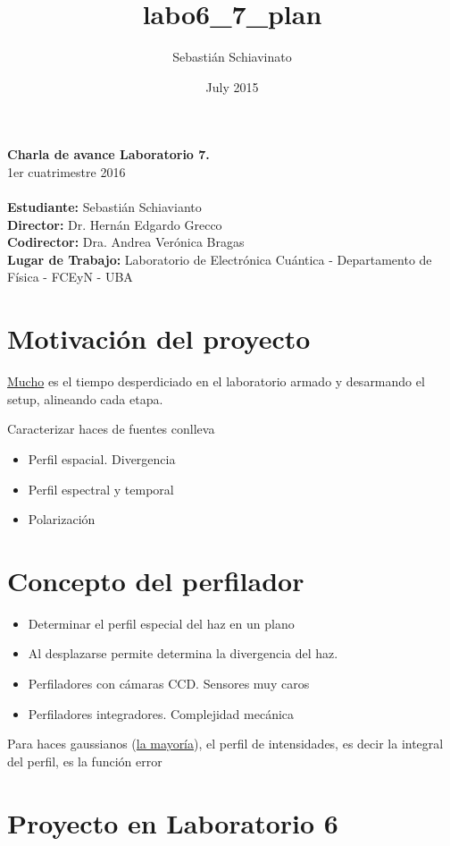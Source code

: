 \documentclass{article}
\title{labo6_7_plan}
\author{Sebastián Schiavinato}
\date{July 2015}
\begin{document}
{\noindent \huge \textbf{Charla de avance Laboratorio 7.}}\\
{\Large 1er cuatrimestre 2016}\\
\\
\noindent \textbf{Estudiante:} Sebastián Schiavianto\\
\textbf{Director:} Dr. Hernán Edgardo Grecco\\
\textbf{Codirector:} Dra. Andrea Verónica Bragas\\
\textbf{Lugar de Trabajo:} Laboratorio de Electrónica Cuántica - Departamento de Física - FCEyN - UBA




\section{Motivación del proyecto}

    \underline{Mucho} es el tiempo desperdiciado en el laboratorio armado y desarmando el setup, alineando cada etapa.
    
    Caracterizar haces de fuentes conlleva
    \begin{itemize}
    \item Perfil espacial. Divergencia
    \item Perfil espectral y temporal
    \item Polarización
    \end{itemize}



\section{Concepto del perfilador}

    \begin{itemize}
        \item Determinar el perfil especial del haz en un plano
        \item Al desplazarse permite determina la divergencia del haz.
        \item Perfiladores con cámaras CCD. Sensores muy caros
        \item Perfiladores integradores. Complejidad mecánica
    \end{itemize}


    Para haces gaussianos (\underline{la mayoría}), el perfil de intensidades, es decir la integral del perfil, es la función error
 
\section{Proyecto en Laboratorio 6}
\end{document}
